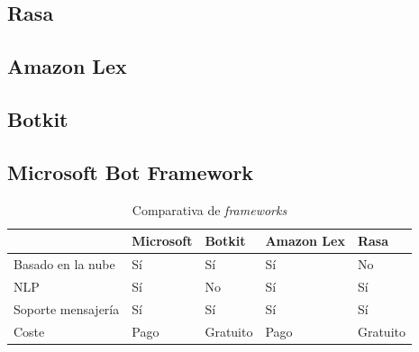 \subsection{Rasa}


\subsection{Amazon Lex}

\subsection{Botkit}

\subsection{Microsoft Bot Framework}

\begin{table}[htbp]
\centering
\begin{tabular}{|l|l|l|l|l|} 
\hline
                   & Microsoft & Botkit   & Amazon Lex & Rasa      \\ 
\hline
Basado en la nube  & Sí        & Sí       & Sí         & No        \\ 
\hline
NLP                & Sí        & No       & Sí         & Sí        \\ 
\hline
Soporte mensajería & Sí        & Sí       & Sí         & Sí        \\ 
\hline
Coste              & Pago      & Gratuito & Pago       & Gratuito  \\
\hline
\end{tabular}
\caption{Comparativa de \textit{frameworks}}
\end{table}


